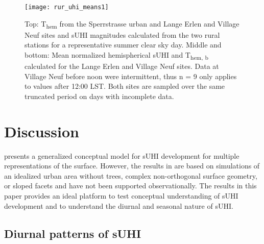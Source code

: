 \begin{bibunit}
\begin{figure}[H]
	\centering
	\texttt{[image: rur\_uhi\_means1]}
	\caption{Top: T\textsubscript{hem} from the Sperrstrasse urban and Lange Erlen and Village Neuf sites and sUHI magnitudes calculated from the two rural stations for a representative summer clear sky day. Middle and bottom: Mean normalized hemispherical sUHI and T\textsubscript{hem, b} calculated for the Lange Erlen and Village Neuf sites. Data at Village Neuf before noon were intermittent, thus n = 9 only applies to values after 12:00 LST. Both sites are sampled over the same truncated period on days with incomplete data.}
	\label{rur_uhi_means}
\end{figure}

\section{Discussion}
\citet{Oke2017} presents a generalized conceptual model for sUHI development for multiple representations of the surface. However, the results in \citet{Oke2017} are based on simulations of an idealized urban area without trees, complex non-orthogonal surface geometry, or sloped facets and have not been supported observationally. The results in this paper provides an ideal platform to test conceptual understanding of sUHI development and to understand the diurnal and seasonal nature of sUHI.

\subsection{Diurnal patterns of sUHI}
\label{gen}


\end{bibunit}
